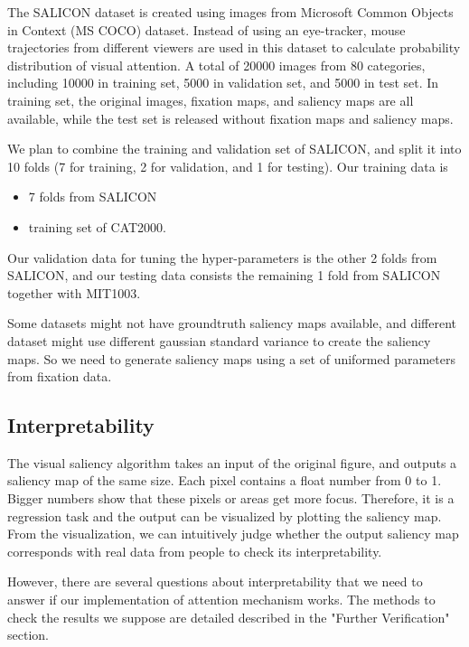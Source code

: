 \documentclass[12pt]{article}
\begin{document}
The SALICON dataset is created using images from Microsoft Common Objects in Context (MS COCO) dataset\cite{linMicrosoftCOCOCommon2015}.
Instead of using an eye-tracker, mouse trajectories from different viewers are used in this dataset 
to calculate probability distribution of visual attention. A total of 20000 images from 80 categories, including
10000 in training set, 5000 in validation set, and 5000 in test set.
In training set, the original images, fixation maps, and saliency maps are all available, while 
the test set is released without fixation maps and saliency maps.


We plan to combine the training and validation set of SALICON, 
and split it into 10 folds (7 for training, 2 for validation, and 1 for testing). 
Our training data is
\begin{itemize}
    \item 7 folds from SALICON
    \item training set of CAT2000.
\end{itemize}
Our validation data for tuning the hyper-parameters is the other 2 folds from SALICON, 
and our testing data consists the remaining 1 fold from SALICON together with MIT1003.

Some datasets might not have groundtruth saliency maps available, and different dataset might use different gaussian standard variance to create the saliency maps.
So we need to generate saliency maps using a set of uniformed parameters from fixation data.


\subsection{Interpretability}

The visual saliency algorithm takes an input of the original figure, and outputs a saliency map of the same size. Each pixel contains a float number from 0 to 1. Bigger numbers show that these pixels or areas get more focus. Therefore, it is a regression task and the output can be visualized by plotting the saliency map. From the visualization, we can intuitively judge whether the output saliency map corresponds with real data from people to check its interpretability.

However, there are several questions about interpretability that we need to answer if our implementation of attention mechanism works. The methods to check the results we suppose are detailed described in the "Further Verification" section.
\end{document}
